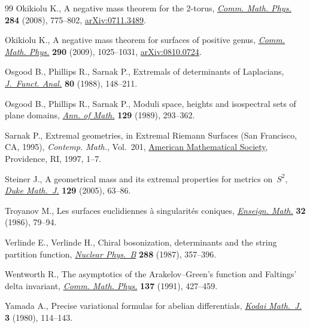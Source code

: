 \documentclass[pdftex]{sigma}
\numberwithin{equation}{section}
\theoremstyle{definition}
\begin{document}
\begin{thebibliography}{99}
Okikiolu K., A negative mass theorem for the 2-torus,
 \href{https://doi.org/10.1007/s00220-008-0644-9}{\textit{Comm. Math. Phys.}}
 \textbf{284} (2008), 775--802,
 \href{http://arxiv.org/abs/0711.3489}{arXiv:0711.3489}.

Okikiolu K., A negative mass theorem for surfaces of positive genus,
 \href{https://doi.org/10.1007/s00220-008-0722-z}{\textit{Comm. Math. Phys.}}
 \textbf{290} (2009), 1025--1031,
 \href{http://arxiv.org/abs/0810.0724}{arXiv:0810.0724}.

Osgood B., Phillips R., Sarnak P., Extremals of determinants of {L}aplacians,
 \href{https://doi.org/10.1016/0022-1236(88)90070-5}{\textit{J.~Funct. Anal.}}
 \textbf{80} (1988), 148--211.

Osgood B., Phillips R., Sarnak P., Moduli space, heights and isospectral sets
 of plane domains, \href{https://doi.org/10.2307/1971449}{\textit{Ann. of
 Math.}} \textbf{129} (1989), 293--362.

Sarnak P., Extremal geometries, in Extremal {R}iemann {S}urfaces ({S}an
 {F}rancisco, {CA}, 1995), \textit{Contemp. Math.}, Vol.~201,
 \href{https://doi.org/10.1090/conm/201/02616}{American Mathematical Society},
 Providence, RI, 1997, 1--7.

Steiner J., A geometrical mass and its extremal properties for metrics
 on~{$S^2$}, \href{https://doi.org/10.1215/S0012-7094-04-12913-6}{\textit{Duke
 Math.~J.}} \textbf{129} (2005), 63--86.

Troyanov M., Les surfaces euclidiennes \`a singularit\'es coniques,
 \href{https://doi.org/10.5169/seals-55079}{\textit{Enseign. Math.}}
 \textbf{32} (1986), 79--94.

Verlinde E., Verlinde H., Chiral bosonization, determinants and the string
 partition function,
 \href{https://doi.org/10.1016/0550-3213(87)90219-7}{\textit{Nuclear Phys.~B}}
 \textbf{288} (1987), 357--396.

Wentworth R., The asymptotics of the {A}rakelov--{G}reen's function and
 {F}altings' delta invariant,
 \href{https://doi.org/10.1007/BF02100272}{\textit{Comm. Math. Phys.}}
 \textbf{137} (1991), 427--459.

Yamada A., Precise variational formulas for abelian differentials,
 \href{https://doi.org/10.2996/kmj/1138036124}{\textit{Kodai Math.~J.}}
 \textbf{3} (1980), 114--143.

\end{thebibliography}\LastPageEnding
\end{document}
